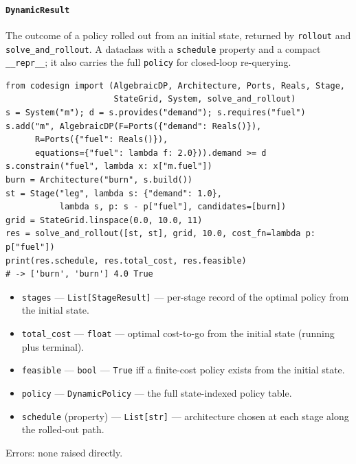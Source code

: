 \documentclass[11pt,a4paper]{article}
\begin{document}
\paragraph{\texttt{DynamicResult}}\label{ref:dynamic:dynamicresult}
The outcome of a policy rolled out from an initial state, returned by
\texttt{rollout} and \texttt{solve\_and\_rollout}. A dataclass with a
\texttt{schedule} property and a compact \texttt{\_\_repr\_\_}; it also
carries the full \texttt{policy} for closed-loop re-querying.
\begin{lstlisting}
from codesign import (AlgebraicDP, Architecture, Ports, Reals, Stage,
                      StateGrid, System, solve_and_rollout)
s = System("m"); d = s.provides("demand"); s.requires("fuel")
s.add("m", AlgebraicDP(F=Ports({"demand": Reals()}),
      R=Ports({"fuel": Reals()}),
      equations={"fuel": lambda f: 2.0})).demand >= d
s.constrain("fuel", lambda x: x["m.fuel"])
burn = Architecture("burn", s.build())
st = Stage("leg", lambda s: {"demand": 1.0},
           lambda s, p: s - p["fuel"], candidates=[burn])
grid = StateGrid.linspace(0.0, 10.0, 11)
res = solve_and_rollout([st, st], grid, 10.0, cost_fn=lambda p: p["fuel"])
print(res.schedule, res.total_cost, res.feasible)
# -> ['burn', 'burn'] 4.0 True
\end{lstlisting}
\begin{itemize}[nosep]
  \item \texttt{stages} --- \texttt{List[StageResult]} --- per-stage record
    of the optimal policy from the initial state.
  \item \texttt{total\_cost} --- \texttt{float} --- optimal cost-to-go from
    the initial state (running plus terminal).
  \item \texttt{feasible} --- \texttt{bool} --- \texttt{True} iff a
    finite-cost policy exists from the initial state.
  \item \texttt{policy} --- \texttt{DynamicPolicy} --- the full
    state-indexed policy table.
  \item \texttt{schedule} (property) --- \texttt{List[str]} --- architecture
    chosen at each stage along the rolled-out path.
\end{itemize}
Errors: none raised directly.
\end{document}
